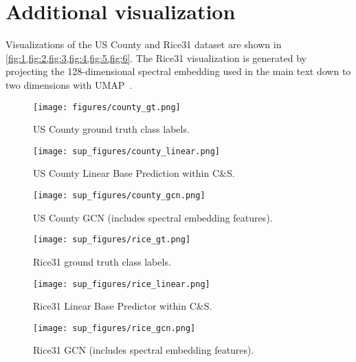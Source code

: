 \documentclass{article}
\newcommand{\framework}{C\&S}
\begin{document}
\section{Additional visualization}

Visualizations of the US County and Rice31 dataset are shown in \cref{fig:1,fig:2,fig:3,fig:4,fig:5,fig:6}. 
The Rice31 visualization is generated by projecting the 128-dimensional spectral embedding used in the main text
down to two dimensions with UMAP~\citep{mcinnes2018umap}.

\begin{figure}[b]
      \centering
      \texttt{[image: figures/county\_gt.png]}
      \caption{US County ground truth class labels.}
      \label{fig:1}
\end{figure}
    
\begin{figure}
      \centering
      \texttt{[image: sup\_figures/county\_linear.png]}
      \caption{US County Linear Base Prediction within \framework{}.}
      \label{fig:2}
\end{figure}

\begin{figure}
      \centering
      \texttt{[image: sup\_figures/county\_gcn.png]}
      \caption{US County GCN (includes spectral embedding features).}
      \label{fig:3}
\end{figure}


\begin{figure}[b]
      \centering
      \texttt{[image: sup\_figures/rice\_gt.png]}
      \caption{Rice31 ground truth class labels.}
      \label{fig:4}
\end{figure}
    
\begin{figure}
      \centering
      \texttt{[image: sup\_figures/rice\_linear.png]}
      \caption{Rice31 Linear Base Predictor within \framework{}.}
      \label{fig:5}
\end{figure}

\begin{figure}
      \centering
      \texttt{[image: sup\_figures/rice\_gcn.png]}
      \caption{Rice31 GCN (includes spectral embedding features).}
      \label{fig:6}
\end{figure}
\end{document}
